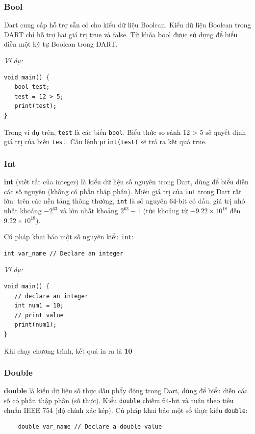\documentclass[../DoAn.tex]{subfiles}
\numberwithin{figure}{chapter}
\begin{document}
\subsubsection{Bool} 
Dart cung cấp hỗ trợ sẵn có cho kiểu dữ liệu Boolean. Kiểu dữ liệu Boolean trong DART chỉ hỗ trợ hai giá trị true và false. Từ khóa bool được sử dụng để biểu diễn một ký tự Boolean trong DART. 

\textit{Ví dụ:} 
\begin{lstlisting}
void main() { 
   bool test; 
   test = 12 > 5; 
   print(test); 
}
\end{lstlisting}

Trong ví dụ trên, \texttt{test} là các biến \texttt{bool}. Biểu thức so sánh 12 > 5 sẽ quyết định giá trị của biến \texttt{test}. Câu lệnh \texttt{print(test)} sẽ trả ra kết quả true.

\subsubsection{Int}
\textbf{int} (viết tắt của integer) là kiểu dữ liệu số nguyên trong Dart, dùng để biểu diễn các số nguyên (không có phần thập phân). Miền giá trị của \texttt{int} trong Dart rất lớn: trên các nền tảng thông thường, \texttt{int} là số nguyên 64-bit có dấu, giá trị nhỏ nhất khoảng $-2^{63}$ và lớn nhất khoảng $2^{63}-1$ (tức khoảng từ $-9.22\times10^{18}$ đến $9.22\times10^{18}$).

Cú pháp khai báo một số nguyên kiểu \texttt{int}: 

\begin{lstlisting}
int var_name // Declare an integer
\end{lstlisting}

\textit{Ví dụ:} 
\begin{lstlisting}
void main() {
   // declare an integer
   int num1 = 10;             
   // print value
   print(num1);
}
\end{lstlisting}
Khi chạy chương trình, kết quả in ra là \textbf{10}

\subsubsection{Double}  
\textbf{double} là kiểu dữ liệu số thực dấu phẩy động trong Dart, dùng để biểu diễn các số có phần thập phân (số thực). Kiểu \texttt{double} chiếm 64-bit và tuân theo tiêu chuẩn IEEE 754 (độ chính xác kép).
Cú pháp khai báo một số thực kiểu \texttt{double}: 
\begin{lstlisting}
    double var_name // Declare a double value
\end{lstlisting}
\end{document}
